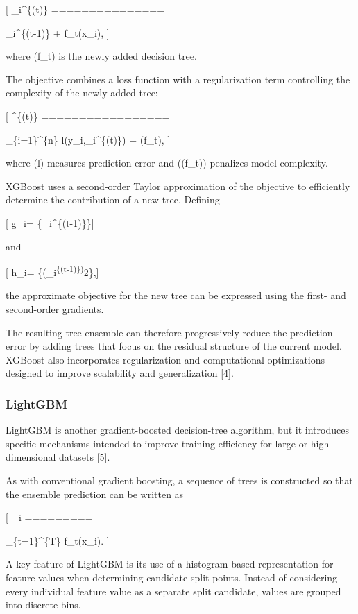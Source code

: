 {[} \_i\^{}\{(t)\} ===============

\_i\^{}\{(t-1)\} + f\_t(x\_i), {]}

where (f\_t) is the newly added decision tree.

The objective combines a loss function with a regularization term controlling the complexity of the newly added tree:

{[} \^{}\{(t)\} =================

\sum\_\{i=1\}\^{}\{n\} l\left(y\_i,\_i\^{}\{(t)\}\right) + \Omega(f\_t), {]}

where (l) measures prediction error and (\Omega(f\_t)) penalizes model complexity.

XGBoost uses a second-order Taylor approximation of the objective to efficiently determine the contribution of a new tree. Defining

{[} g\_i=  \{\partial {}\_i\^{}\{(t-1)\}\}{]}

and

{[} h\_i=  \{\partial (\_i\textsuperscript{\{(t-1)\})}2\},{]}

the approximate objective for the new tree can be expressed using the first- and second-order gradients.

The resulting tree ensemble can therefore progressively reduce the prediction error by adding trees that focus on the residual structure of the current model. XGBoost also incorporates regularization and computational optimizations designed to improve scalability and generalization {[}4{]}.

\subsubsection{LightGBM}\label{lightgbm}

LightGBM is another gradient-boosted decision-tree algorithm, but it introduces specific mechanisms intended to improve training efficiency for large or high-dimensional datasets {[}5{]}.

As with conventional gradient boosting, a sequence of trees is constructed so that the ensemble prediction can be written as

{[} \_i =========

\sum\_\{t=1\}\^{}\{T\} f\_t(x\_i). {]}

A key feature of LightGBM is its use of a histogram-based representation for feature values when determining candidate split points. Instead of considering every individual feature value as a separate split candidate, values are grouped into discrete bins.

